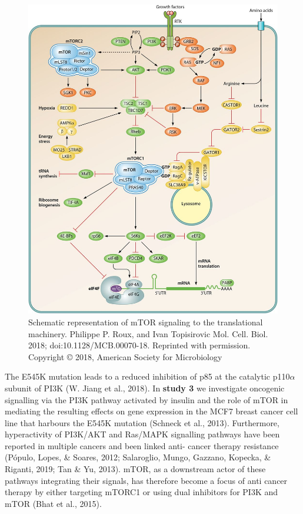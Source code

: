 \documentclass[12pt,openany]{book}
\begin{document}
\begin{figure}
  \includegraphics{./figures/mTORsignal.jpg}
  \caption{Schematic representation of mTOR signaling to the translational machinery. Philippe P. Roux, and Ivan Topisirovic Mol. Cell. Biol. 2018; doi:10.1128/MCB.00070-18. Reprinted with permission. Copyright © 2018, American Society for Microbiology
 \label{fig:mtorsignal}}
\end{figure}

The E545K mutation leads to a reduced inhibition of p85 at the catalytic
p110\(\alpha\) subunit of PI3K (W. Jiang et al., 2018). In \textbf{study
3} we investigate oncogenic signalling via the PI3K pathway activated by
insulin and the role of mTOR in mediating the resulting effects on gene
expression in the MCF7 breast cancer cell line that harbours the E545K
mutation (Schneck et al., 2013). Furthermore, hyperactivity of PI3K/AKT
and Ras/MAPK signalling pathways have been reported in multiple cancers
and been linked anti- cancer therapy resistance (Pópulo, Lopes, \&
Soares, 2012; Salaroglio, Mungo, Gazzano, Kopecka, \& Riganti, 2019; Tan
\& Yu, 2013). mTOR, as a downstream actor of these pathways integrating
their signals, has therefore become a focus of anti cancer therapy by
either targeting mTORC1 or using dual inhibitors for PI3K and mTOR (Bhat
et al., 2015).
\end{document}
